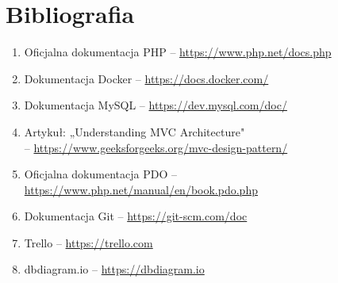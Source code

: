 \documentclass[12pt,a4paper]{article}
\begin{document}
\section{Bibliografia}
\begin{enumerate}
	\item Oficjalna dokumentacja PHP -- \url{https://www.php.net/docs.php}
	\item Dokumentacja Docker -- \url{https://docs.docker.com/}
	\item Dokumentacja MySQL -- \url{https://dev.mysql.com/doc/}
	\item Artykuł: „Understanding MVC Architecture" \\ -- \url{https://www.geeksforgeeks.org/mvc-design-pattern/}
	\item Oficjalna dokumentacja PDO -- \url{https://www.php.net/manual/en/book.pdo.php}
	\item Dokumentacja Git -- \url{https://git-scm.com/doc}
	\item Trello -- \url{https://trello.com}
	\item dbdiagram.io -- \url{https://dbdiagram.io}
\end{enumerate}
	
\end{document}
